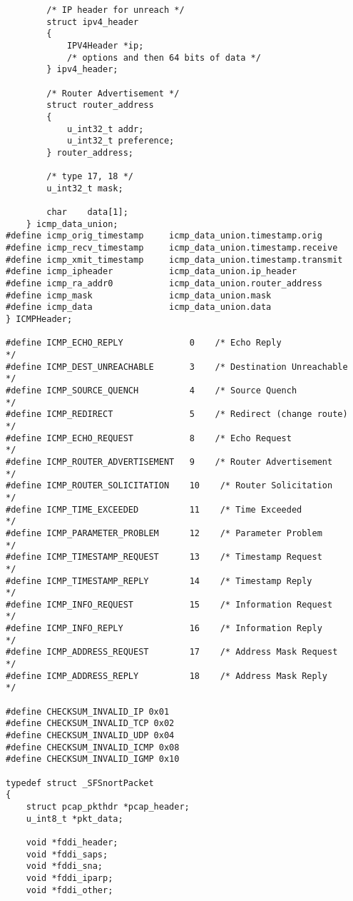 \documentclass[english]{report}
\begin{document}
\begin{verbatim}
        /* IP header for unreach */
        struct ipv4_header
        {
            IPV4Header *ip;
            /* options and then 64 bits of data */
        } ipv4_header;

        /* Router Advertisement */
        struct router_address
        {
            u_int32_t addr;
            u_int32_t preference;
        } router_address;

        /* type 17, 18 */
        u_int32_t mask;

        char    data[1];
    } icmp_data_union;
#define icmp_orig_timestamp     icmp_data_union.timestamp.orig
#define icmp_recv_timestamp     icmp_data_union.timestamp.receive
#define icmp_xmit_timestamp     icmp_data_union.timestamp.transmit
#define icmp_ipheader           icmp_data_union.ip_header
#define icmp_ra_addr0           icmp_data_union.router_address
#define icmp_mask               icmp_data_union.mask
#define icmp_data               icmp_data_union.data
} ICMPHeader;

#define ICMP_ECHO_REPLY             0    /* Echo Reply                   */
#define ICMP_DEST_UNREACHABLE       3    /* Destination Unreachable      */
#define ICMP_SOURCE_QUENCH          4    /* Source Quench                */
#define ICMP_REDIRECT               5    /* Redirect (change route)      */
#define ICMP_ECHO_REQUEST           8    /* Echo Request                 */
#define ICMP_ROUTER_ADVERTISEMENT   9    /* Router Advertisement         */
#define ICMP_ROUTER_SOLICITATION    10    /* Router Solicitation          */
#define ICMP_TIME_EXCEEDED          11    /* Time Exceeded                */
#define ICMP_PARAMETER_PROBLEM      12    /* Parameter Problem            */
#define ICMP_TIMESTAMP_REQUEST      13    /* Timestamp Request            */
#define ICMP_TIMESTAMP_REPLY        14    /* Timestamp Reply              */
#define ICMP_INFO_REQUEST           15    /* Information Request          */
#define ICMP_INFO_REPLY             16    /* Information Reply            */
#define ICMP_ADDRESS_REQUEST        17    /* Address Mask Request         */
#define ICMP_ADDRESS_REPLY          18    /* Address Mask Reply           */

#define CHECKSUM_INVALID_IP 0x01
#define CHECKSUM_INVALID_TCP 0x02
#define CHECKSUM_INVALID_UDP 0x04
#define CHECKSUM_INVALID_ICMP 0x08
#define CHECKSUM_INVALID_IGMP 0x10

typedef struct _SFSnortPacket
{
    struct pcap_pkthdr *pcap_header;
    u_int8_t *pkt_data;

    void *fddi_header;
    void *fddi_saps;
    void *fddi_sna;
    void *fddi_iparp;
    void *fddi_other;


\end{verbatim}
\end{document}
